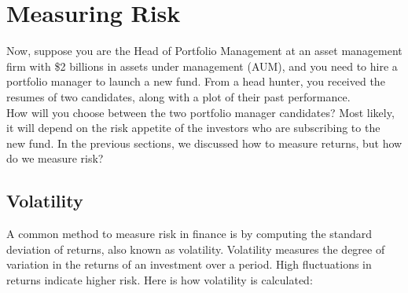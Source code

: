 \documentclass{article}
\begin{document}
\clearpage

\section{Measuring Risk}

Now, suppose you are the Head of Portfolio Management at an asset management firm with \$2 billions in assets under management (AUM), and you need to hire a portfolio manager to launch a new fund. From a head hunter, you received the resumes of two candidates, along with a plot of their past performance. \\

How will you choose between the two portfolio manager candidates? Most likely, it will depend on the risk appetite of the investors who are subscribing to the new fund. In the previous sections, we discussed how to measure returns, but how do we measure risk?

\subsection{Volatility}

A common method to measure risk in finance is by computing the standard deviation of returns, also known as volatility. Volatility measures the degree of variation in the returns of an investment over a period. High fluctuations in returns indicate higher risk. Here is how volatility is calculated:
\end{document}
